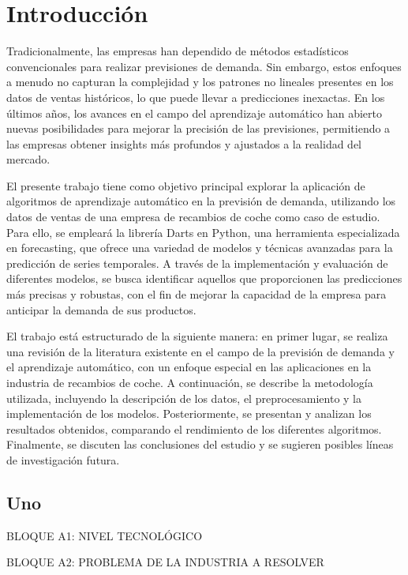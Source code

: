 \chapter{Introducción}\label{cap1}


Tradicionalmente, las empresas han dependido de métodos estadísticos convencionales para realizar previsiones de demanda. Sin embargo, estos enfoques a menudo no capturan la complejidad y los patrones no lineales presentes en los datos de ventas históricos, lo que puede llevar a predicciones inexactas. En los últimos años, los avances en el campo del aprendizaje automático han abierto nuevas posibilidades para mejorar la precisión de las previsiones, permitiendo a las empresas obtener insights más profundos y ajustados a la realidad del mercado.

El presente trabajo tiene como objetivo principal explorar la aplicación de algoritmos de aprendizaje automático en la previsión de demanda, utilizando los datos de ventas de una empresa de recambios de coche como caso de estudio. Para ello, se empleará la librería Darts en Python, una herramienta especializada en forecasting, que ofrece una variedad de modelos y técnicas avanzadas para la predicción de series temporales. A través de la implementación y evaluación de diferentes modelos, se busca identificar aquellos que proporcionen las predicciones más precisas y robustas, con el fin de mejorar la capacidad de la empresa para anticipar la demanda de sus productos.

El trabajo está estructurado de la siguiente manera: en primer lugar, se realiza una revisión de la literatura existente en el campo de la previsión de demanda y el aprendizaje automático, con un enfoque especial en las aplicaciones en la industria de recambios de coche. A continuación, se describe la metodología utilizada, incluyendo la descripción de los datos, el preprocesamiento y la implementación de los modelos. Posteriormente, se presentan y analizan los resultados obtenidos, comparando el rendimiento de los diferentes algoritmos. Finalmente, se discuten las conclusiones del estudio y se sugieren posibles líneas de investigación futura.


\section{Uno}



BLOQUE A1: NIVEL TECNOLÓGICO

BLOQUE A2: PROBLEMA DE LA INDUSTRIA A RESOLVER


